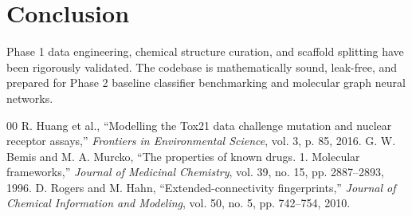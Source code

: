 \documentclass[conference]{IEEEtran}
\begin{document}
\section{Conclusion}
Phase 1 data engineering, chemical structure curation, and scaffold splitting have been rigorously validated. The codebase is mathematically sound, leak-free, and prepared for Phase 2 baseline classifier benchmarking and molecular graph neural networks.

\begin{thebibliography}{00}
 R. Huang et al., ``Modelling the Tox21 data challenge mutation and nuclear receptor assays,'' \emph{Frontiers in Environmental Science}, vol. 3, p. 85, 2016.
 G. W. Bemis and M. A. Murcko, ``The properties of known drugs. 1. Molecular frameworks,'' \emph{Journal of Medicinal Chemistry}, vol. 39, no. 15, pp. 2887--2893, 1996.
 D. Rogers and M. Hahn, ``Extended-connectivity fingerprints,'' \emph{Journal of Chemical Information and Modeling}, vol. 50, no. 5, pp. 742--754, 2010.
\end{thebibliography}
\end{document}
